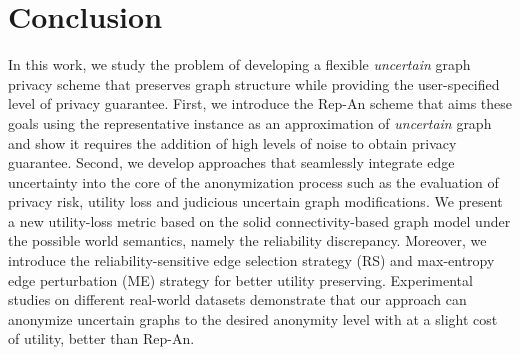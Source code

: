 \section{Conclusion}
In this work, we study the problem of developing a flexible \emph{uncertain} graph privacy scheme that preserves graph structure while providing the user-specified level of privacy guarantee. First, we introduce the Rep-An scheme that aims these goals using the representative instance as an approximation of \emph{uncertain} graph and show it requires the addition of high levels of noise to obtain privacy guarantee. 
Second, we develop {\SysNameNS} approaches that seamlessly integrate edge uncertainty into the core of the
anonymization process such as the evaluation of privacy risk, utility loss and judicious uncertain graph modifications. 
We present a new utility-loss metric based on the solid connectivity-based graph model under the possible world semantics, namely the reliability discrepancy. Moreover, we introduce the reliability-sensitive edge selection strategy (RS) and max-entropy edge perturbation (ME) strategy for better utility preserving. 
Experimental studies on different real-world datasets demonstrate that our approach can anonymize uncertain graphs to the desired anonymity level with at a slight cost of utility, better than {Rep-An}. 